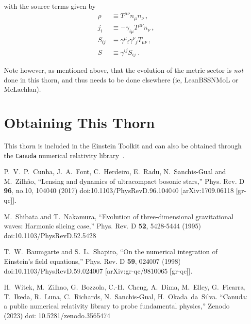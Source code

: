 %
with the source terms given by
%
\begin{align*}
  \rho & \equiv T^{\mu \nu}n_{\mu}n_{\nu} \,,\\
  j_i  &\equiv -\gamma_{i\mu} T^{\mu \nu}n_{\nu} \,, \\
  S_{ij} &\equiv \gamma^{\mu}{}_i \gamma^{\nu}{}_j T_{\mu \nu} \,, \\
  S     & \equiv \gamma^{ij}S_{ij} \,.
\end{align*}

Note however, as mentioned above, that the evolution of the metric sector is \emph{not} done in this thorn, and thus needs to be done elsewhere (ie, LeanBSSNMoL or McLachlan).


\section{Obtaining This Thorn}

This thorn is included in the Einstein Toolkit and can also be obtained through
the \texttt{Canuda} numerical relativity library~\cite{Canuda}.


\begin{thebibliography}{9}

P.~V.~P.~Cunha, J.~A.~Font, C.~Herdeiro, E.~Radu, N.~Sanchis-Gual and M.~Zilh\~ao,
``Lensing and dynamics of ultracompact bosonic stars,''
Phys. Rev. D \textbf{96}, no.10, 104040 (2017)
doi:10.1103/PhysRevD.96.104040
[arXiv:1709.06118 [gr-qc]].

M.~Shibata and T.~Nakamura,
``Evolution of three-dimensional gravitational waves: Harmonic slicing case,''
Phys. Rev. D \textbf{52}, 5428-5444 (1995)
doi:10.1103/PhysRevD.52.5428

T.~W.~Baumgarte and S.~L.~Shapiro,
``On the numerical integration of Einstein's field equations,''
Phys. Rev. D \textbf{59}, 024007 (1998)
doi:10.1103/PhysRevD.59.024007
[arXiv:gr-qc/9810065 [gr-qc]].

H.~Witek, M.~Zilhao, G.~Bozzola, C.-H.~Cheng, A.~Dima, M.~Elley, G.~Ficarra, T.~Ikeda, R.~Luna, C.~Richards, N.~Sanchis-Gual, H.~Okada~da~Silva.
``Canuda: a public numerical relativity library to probe fundamental physics,''
Zenodo (2023)
doi: 10.5281/zenodo.3565474

\end{thebibliography}




